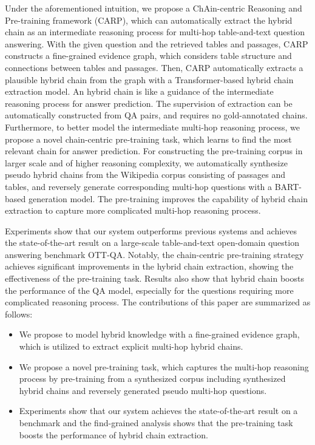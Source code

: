 \documentclass[11pt]{article}
\begin{document}
Under the aforementioned intuition, we propose a ChAin-centric Reasoning and Pre-training framework (CARP), which can automatically extract the hybrid chain as an intermediate reasoning process for multi-hop table-and-text question answering. 
With the given question and the retrieved tables and passages, CARP constructs a fine-grained evidence graph, which considers table structure and connections between tables and passages. 
	Then, CARP automatically extracts a plausible hybrid chain from the graph with a Transformer-based hybrid chain extraction model. 
An hybrid chain is like a guidance of the intermediate reasoning process for answer prediction. 
The supervision of extraction can be automatically constructed from QA pairs, and requires no gold-annotated chains.
Furthermore, to better model the intermediate multi-hop reasoning process, we propose a novel chain-centric pre-training task, which learns to find the most relevant chain for answer prediction.
For constructing the pre-training corpus in larger scale and of higher reasoning complexity, we automatically synthesize pseudo hybrid chains from the Wikipedia corpus consisting of passages and tables, and reversely generate corresponding multi-hop questions with a BART-based generation model.
The pre-training improves the capability of hybrid chain extraction to capture more complicated multi-hop reasoning process. 
	
	
	Experiments show that our system outperforms previous systems and achieves the state-of-the-art result on a large-scale table-and-text open-domain question answering benchmark OTT-QA. 
Notably, the chain-centric pre-training strategy achieves significant improvements in the hybrid chain extraction, showing the effectiveness of the pre-training task.
Results also show that hybrid chain boosts the performance of the QA model, especially for the questions requiring more complicated reasoning process. 
The contributions of this paper are summarized as follows:
	\begin{itemize}
		\item We propose to model hybrid knowledge with a fine-grained evidence graph, which is utilized to extract explicit multi-hop hybrid chains.
\item 
		We propose a novel pre-training task, which captures the multi-hop reasoning process by pre-training from a synthesized corpus including synthesized hybrid chains and reversely generated pseudo multi-hop questions.
\item Experiments show that our system achieves the state-of-the-art result on a benchmark and the find-grained analysis shows that the pre-training task boosts the performance of hybrid chain extraction. 
	\end{itemize}
	\fi
\end{document}
